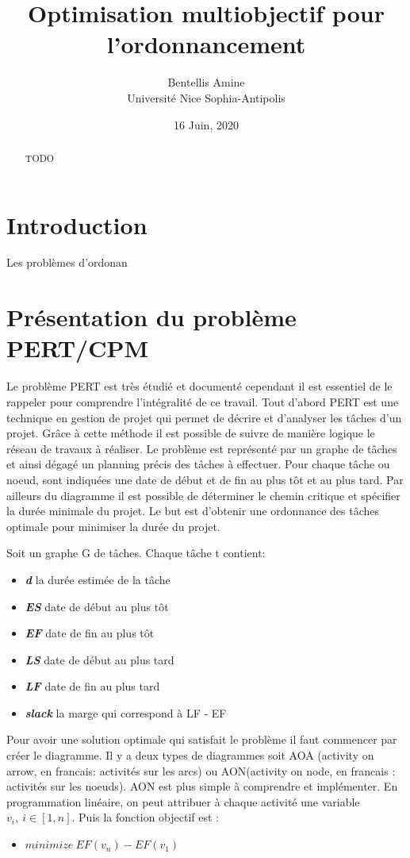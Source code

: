 \documentclass{article}
\title{Optimisation multiobjectif pour l'ordonnancement}
\author{Bentellis Amine  \\
	Université Nice Sophia-Antipolis  \\
	}
\date{16 Juin, 2020}
\begin{document}
\maketitle


\begin{abstract}
TODO
\end{abstract}

\section{Introduction}

  Les problèmes d'ordonan


\section{Présentation du problème PERT/CPM} \label{pertcpm}

\qquad Le problème PERT est très étudié et documenté cependant il est essentiel de le rappeler pour comprendre l’intégralité de ce travail. Tout d’abord PERT est une technique en gestion de projet qui permet de décrire et d’analyser les tâches d’un projet. Grâce à cette méthode il est possible de suivre de manière logique le réseau de travaux à réaliser. Le problème est représenté par un graphe de tâches et ainsi dégagé un planning précis des tâches à effectuer. Pour chaque tâche ou noeud, sont indiquées une date de début et de fin au plus tôt et au plus tard. Par ailleurs du diagramme il est possible de déterminer le chemin critique et spécifier la durée minimale du projet. Le but est d’obtenir une ordonnance des tâches optimale pour minimiser la durée du projet.

\noindent
Soit un graphe G de tâches. Chaque tâche t contient:
\begin{itemize}
\item \textit{\textbf{d}} la durée estimée de la tâche
\item \textit{\textbf{ES}} date de début au plus tôt
\item \textit{\textbf{EF}} date de fin au plus tôt
\item \textit{\textbf{LS}} date de début au plus tard
\item \textit{\textbf {LF}} date de fin au plus tard
\item \textit{\textbf {slack}} la marge qui correspond à LF - EF 
\end{itemize}

Pour avoir une solution optimale qui satisfait le problème il faut commencer par créer le diagramme. Il y a deux types de diagrammes soit AOA (activity on arrow, en francais: activités sur les arcs) ou AON(activity on node, en francais : activités sur les noeuds). AON est plus simple à comprendre et implémenter. En programmation linéaire, on peut attribuer à chaque activité une variable  $v_i, \ i \in [1,n]$. Puis la fonction objectif est :
\begin{itemize}

\item[] $minimize \ EF(v_n) - EF(v_1)$

\end{itemize}
\end{document}
